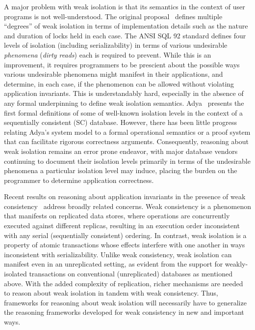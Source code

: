A major problem with weak isolation is that its semantics in the
context of user programs is not well-understood. The original
proposal~\cite{gray1976} defines multiple ``degrees'' of weak
isolation in terms of implementation details such as the nature and
duration of locks held in each case. The ANSI SQL 92 standard defines
four levels of isolation (including serializability) in terms of
various undesirable \emph{phenomena} (\eg \emph{dirty reads}) each is
required to prevent. While this is an improvement, it requires
programmers to be prescient about the possible ways various
undesirable phenomena might manifest in their applications, and
determine, in each case, if the phenomenon can be allowed without
violating application invariants. This is understandably hard,
especially in the absence of any formal underpinning to define weak
isolation semantics.  Adya~\cite{adyaphd} presents the first formal
definitions of some of well-known isolation levels in the context of a
sequentially consistent (SC) database.  However, there has been little
progress relating Adya's system model to a formal operational
semantics or a proof system that can facilitate rigorous correctness
arguments. Consequently, reasoning about weak isolation remains an
error prone endeavor, with major database vendors~\cite{postgresiso,
  mysqliso, oracleiso} continuing to document their isolation levels
primarily in terms of the undesirable phenomena a particular isolation
level may induce, placing the burden on the programmer to determine
application correctness.

Recent results on reasoning about application invariants in the
presence of weak consistency~\cite{burckhardt14, redblueosdi,
  redblueatc, ecinec, gotsmanpopl16} address broadly related concerns.
Weak consistency is a phenomenon that manifests on replicated data
stores, where operations are concurrently executed against different
replicas, resulting in an execution order inconsistent with any serial
(sequentially consistent) ordering.  In contrast, weak isolation is a
property of atomic transactions whose effects interfere with one
another in ways inconsistent with serializability.  Unlike weak
consistency, weak isolation can manifest even in an unreplicated
setting, as evident from the support for weakly-isolated transactions
on conventional (unreplicated) databases as mentioned above.  With the
added complexity of replication, richer mechanisms are needed to
reason about weak isolation in tandem with weak consistency. Thus,
frameworks for reasoning about weak isolation will necessarily have to
generalize the reasoning frameworks developed for weak consistency in
new and important ways.

